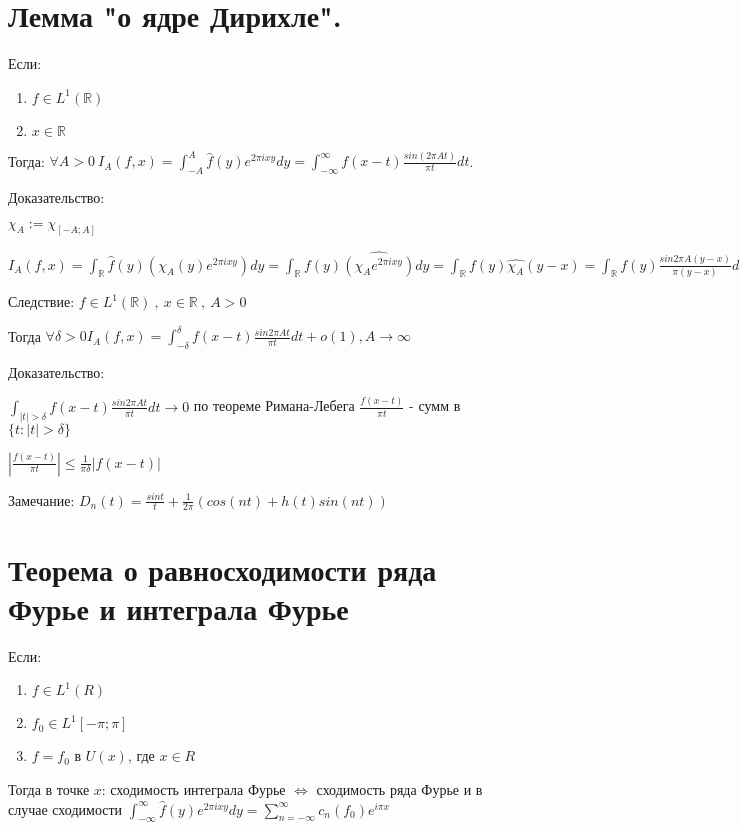 \documentclass[paper=a4, fontsize=14pt]{report}
\begin{document}
\section{Лемма "о ядре Дирихле".}
Если: 
\begin{enumerate}
    \item $f \in L^{1}(\mathbb{R})$
    \item $x \in \mathbb{R}$
\end{enumerate} 
Тогда: $\forall A > 0 \ I_{A}(f, x) = \int_{-A}^{A}\widehat f(y)e^{2\pi i x y}dy = \int_{-\infty}^{\infty}f(x - t)\frac{sin (2\pi A t)}{\pi t}dt$.

Доказательство:

$\chi_{A} := \chi_{[-A; A]}$

$I_{A}(f, x)=\int_{\mathbb{R}}\widehat f(y)(\chi_{A}(y)e^{2\pi i x y})dy=\int_{\mathbb{R}}f(y)\widehat{(\chi_{A}e^{2\pi i x y})}dy = \int_{\mathbb{R}}f(y)\widehat{\chi_{A}}(y - x)=\int_{\mathbb{R}}f(y)\frac{sin 2\pi A (y - x)}{\pi (y - x)}dy$

Следствие: $f \in L^{1}(\mathbb{R}) \ , \ x \in \mathbb{R} \ , \ A > 0 $ 

Тогда $\forall \delta > 0 I_{A}(f, x) = \int_{-\delta}^{\delta}f(x - t)\frac{sin 2\pi A t}{\pi t}dt + o(1), A \rightarrow \infty$ 

Доказательство:

$\int_{|t| > \delta} f(x - t) \frac{sin 2 \pi A t}{\pi t}dt \rightarrow 0$ по теореме Римана-Лебега
$\frac{f(x - t)}{\pi t}$ - сумм в $\{t : |t| > \delta\}$ 

$| \frac{f(x - t)}{\pi t}| \leq \frac{1}{\pi \delta} |f(x - t)|$ 

Замечание: $D_{n}(t) = \frac{sin t}{t} + \frac{1}{2\pi}(cos(nt) + h(t) sin(nt)) $

\section{Теорема о равносходимости ряда Фурье и интеграла Фурье}

Если: 
\begin{enumerate}
	\item $f \in L^{1}(R)$
	\item $f_{0} \in L^{1}[-\pi; \pi]$
	\item $f = f_{0}$ в $U(x)$, где $x \in R$
\end{enumerate} 
Тогда в точке $x$: сходимость интеграла Фурье $\Leftrightarrow$ сходимость ряда Фурье и в случае сходимости $\int_{-\infty}^{\infty}\hat f(y)e^{2\pi i x y}dy=\sum_{n=-\infty}^{\infty}c_n(f_0)e^{i\pi x}$
\end{document}
